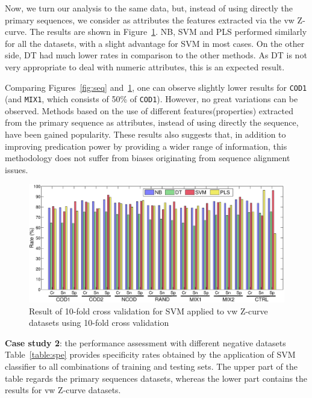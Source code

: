\documentclass{sig-alternate}
\theoremstyle{plain}
\begin{document}
Now, we turn our analysis to the same data, but, instead of using directly the primary sequences, we  consider as attributes  the features extracted via the vw  Z-curve. The results are shown in Figure~\ref{fig:zcurve}.  NB, SVM and PLS performed similarly for all the datasets, with a slight advantage for SVM in most cases. On the other side, DT had much lower rates in comparison to the other methods. As DT is not very appropriate to deal with numeric attributes, this is an expected result. 

Comparing Figures~\ref{fig:seq} and~\ref{fig:zcurve}, one can observe slightly lower results for {\tt COD1}  (and {\tt MIX1}, which consists of 50\% of {\tt COD1}). However, no great variations can be observed. Methods based on the use of different  features(properties)  extracted from the primary sequence as attributes, instead of using directly the sequence,  have been gained popularity.  These results also suggests that, in addition to improving predication power by providing a wider range of information, this methodology does not suffer from biases originating from sequence alignment issues. \\

\begin{figure}
\vspace{0.0cm}
    \centering
    \includegraphics[width=1.0\textwidth]{Figs/Fig2.eps}
    \caption{Result of 10-fold cross validation for  SVM applied to vw Z-curve datasets using 10-fold cross validation  \label{fig:zcurve}}
   
\vspace{0.0cm}
\end{figure}

\noindent
{\bf Case study 2}: the performance assessment with different negative datasets \\

Table~\ref{table:spe} provides specificity rates obtained by the application of SVM classifier to all combinations of training and testing sets. The upper part of the table regards the primary sequences datasets, whereas the lower part contains the results for vw Z-curve datasets. 
\end{document}
